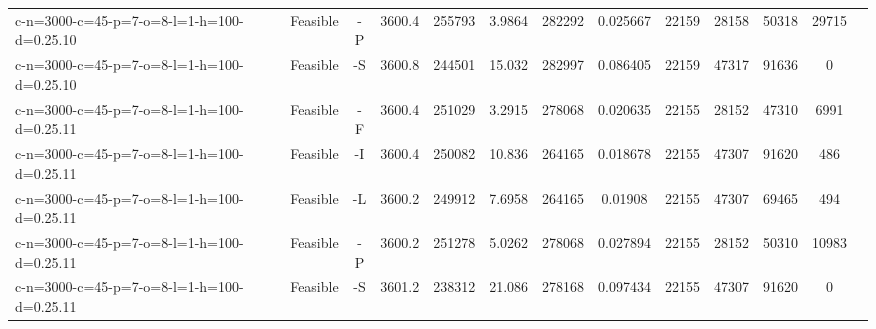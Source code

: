 \documentclass[landscape, a4paper]{article}
\begin{document}
\begin{center}
\begin{tabular}{lcccccccccccc}
c-n=3000-c=45-p=7-o=8-l=1-h=100-d=0.25.10 & Feasible & -P & 3600.4 & 255793 & 3.9864 & 282292 & 0.025667 & 22159 & 28158 & 50318 & 29715 & \\
c-n=3000-c=45-p=7-o=8-l=1-h=100-d=0.25.10 & Feasible & -S & 3600.8 & 244501 & 15.032 & 282997 & 0.086405 & 22159 & 47317 & 91636 & 0 & \\
c-n=3000-c=45-p=7-o=8-l=1-h=100-d=0.25.11 & Feasible & -F & 3600.4 & 251029 & 3.2915 & 278068 & 0.020635 & 22155 & 28152 & 47310 & 6991 & \\
c-n=3000-c=45-p=7-o=8-l=1-h=100-d=0.25.11 & Feasible & -I & 3600.4 & 250082 & 10.836 & 264165 & 0.018678 & 22155 & 47307 & 91620 & 486 & \\
c-n=3000-c=45-p=7-o=8-l=1-h=100-d=0.25.11 & Feasible & -L & 3600.2 & 249912 & 7.6958 & 264165 & 0.01908 & 22155 & 47307 & 69465 & 494 & \\
c-n=3000-c=45-p=7-o=8-l=1-h=100-d=0.25.11 & Feasible & -P & 3600.2 & 251278 & 5.0262 & 278068 & 0.027894 & 22155 & 28152 & 50310 & 10983 & \\
c-n=3000-c=45-p=7-o=8-l=1-h=100-d=0.25.11 & Feasible & -S & 3601.2 & 238312 & 21.086 & 278168 & 0.097434 & 22155 & 47307 & 91620 & 0 & \\
\end{tabular}
\end{center}
\end{document}
